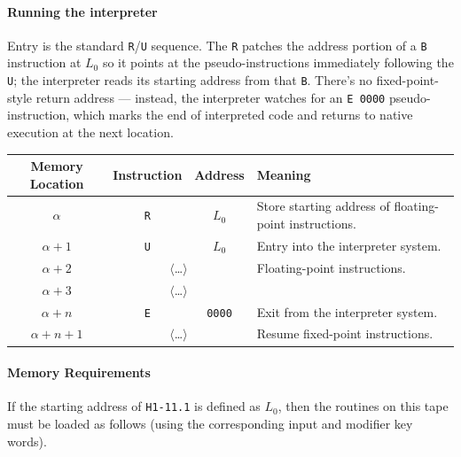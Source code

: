\paragraph{Running the interpreter}
Entry is the standard \texttt{R}/\texttt{U} sequence. The \texttt{R} patches the address portion of a \texttt{B} instruction at $L_0$ so it points at the pseudo-instructions immediately following the \texttt{U}; the interpreter reads its starting address from that \texttt{B}. There's no fixed-point-style return address --- instead, the interpreter watches for an \texttt{E 0000} pseudo-instruction, which marks the end of interpreted code and returns to native execution at the next location.

\begin{table}[h!]
\centering
\begin{tabularx}{\textwidth}{cccX}
\toprule
\textbf{Memory Location} & \textbf{Instruction} & \textbf{Address} & \textbf{Meaning} \\
\midrule
$\alpha$             & \texttt{R}                    & $L_0$            & Store starting address of floating-point instructions. \\
$\alpha+1$           & \texttt{U}                    & $L_0$            & Entry into the interpreter system. \\
$\alpha+2$           & \multicolumn{2}{c}{$\langle$\dots$\rangle$}               & Floating-point instructions. \\
$\alpha+3$           & \multicolumn{2}{c}{$\langle$\dots$\rangle$}               & \\
$\alpha+n$           & \texttt{E}                    & \texttt{0000}             & Exit from the interpreter system.\\
$\alpha+n+1$         & \multicolumn{2}{c}{$\langle$\dots$\rangle$}               & Resume fixed-point instructions. \\
\bottomrule
\end{tabularx}
\end{table} 

\paragraph{Memory Requirements}
If the starting address of \texttt{H1-11.1} is defined as $L_0$, then the routines on this tape must be loaded as follows (using the corresponding input and modifier key words).

